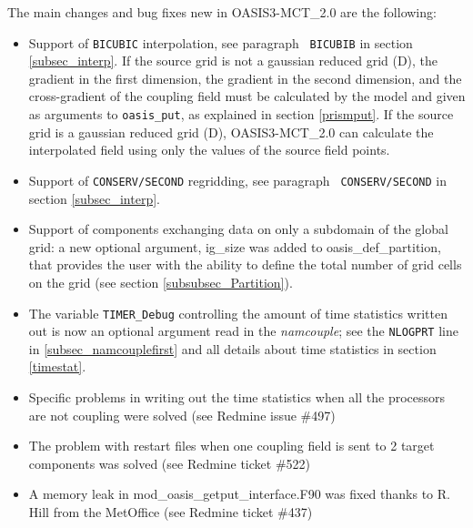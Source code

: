 The main changes and bug fixes new in OASIS3-MCT\_2.0 are the
following:
\begin{itemize}

\item Support of {\tt BICUBIC} interpolation, see paragraph {\tt
    BICUBIB} in section \ref{subsec_interp}. If the source grid
    is not a gaussian reduced grid (D), the gradient in the first dimension, 
    the gradient in the second dimension, and the cross-gradient 
    of the coupling field must be calculated by the model and 
    given as arguments to {\tt oasis\_put}, as explained in section \ref{prismput}.
    If the source grid is a gaussian reduced grid (D), OASIS3-MCT\_2.0 
    can calculate the interpolated field using only the values of the source
    field points.

\item Support of {\tt CONSERV/SECOND} regridding, see paragraph {\tt
    CONSERV/SECOND} in section \ref{subsec_interp}.

\item Support of components exchanging data on only a subdomain of the
  global grid: a new optional argument, ig\_size was added to
  oasis\_def\_partition, that provides the user with the ability to
  define the total number of grid cells on the grid (see section
  \ref{subsubsec_Partition}).


\item The variable {\tt TIMER\_Debug} controlling the amount of time
  statistics written out is now an optional argument read in the {\it
    namcouple}; see the {\tt NLOGPRT} line in
  \ref{subsec_namcouplefirst} and all details about time statistics in
  section \ref{timestat}.

\item Specific problems in writing out the time statistics when all
  the processors are not coupling were solved (see Redmine issue
  \#497)

\item The problem with restart files when one coupling field is sent
  to 2 target components was solved (see Redmine ticket \#522)

\item A memory leak in mod\_oasis\_getput\_interface.F90 was fixed
  thanks to R. Hill from the MetOffice (see Redmine ticket \#437)


\end{itemize}
